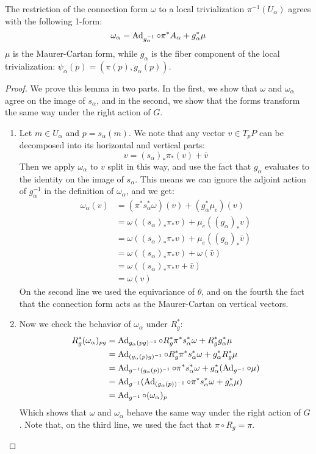 \begin{lem}
The restriction of the connection form $\omega$ to a local trivialization $\pi^{-1}(U_{\alpha})$ agrees with the following 1-form:
\[    \omega_{\alpha} = \operatorname{Ad}_{g_{\alpha}^{-1}} \circ \pi^* A_{\alpha} + g_{\alpha}^* \mu     \]
$\mu$ is the Maurer-Cartan form, while $g_{\alpha}$ is the fiber component of the local trivialization: $\psi_{\alpha}(p) = (\pi(p), g_{\alpha}(p))$.
\end{lem}

\begin{proof}
We prove this lemma in two parts. In the first, we show that $\omega$ and $\omega_{\alpha}$ agree on the image of $s_{\alpha}$, and in the second, we show that the forms transform the same way under the right action of $G$.
\begin{enumerate}
\item Let $m \in U_{\alpha}$ and $p = s_{\alpha}(m)$. We note that any vector $v \in T_pP$ can be decomposed into its horizontal and vertical parts:
\[   v = (s_{\alpha})_* \pi_* (v) + \bar v  \]
Then we apply $\omega_{\alpha}$ to $v$ split in this way, and use the fact that $g_{\alpha}$ evaluates to the identity on the image of $s_{\alpha}$. This means we can ignore the adjoint action of $g_{\alpha}^{-1}$ in the definition of $\omega_{\alpha}$, and we get:
\begin{align*}
\omega_{\alpha}(v) &= (\pi^* s_{\alpha}^* \omega)(v) + (g_{\alpha}^* \mu_e) (v) \\
&= \omega((s_{\alpha})_* \pi_* v) + \mu_e((g_{\alpha})_* v) \\
&= \omega((s_{\alpha})_* \pi_* v) + \mu_e((g_{\alpha})_* \bar v) \\
&= \omega((s_{\alpha})_* \pi_* v) + \omega(\bar v) \\
&= \omega((s_{\alpha})_* \pi_* v + \bar v) \\
&= \omega(v)
\end{align*}
On the second line we used the equivariance of $\theta$, and on the fourth the fact that the connection form acts as the Maurer-Cartan on vertical vectors.
\item Now we check the behavior of $\omega_{\alpha}$ under $R_g^*$:
\begin{align*}
R_g^*(\omega_{\alpha})_{pg} &= \operatorname{Ad}_{g_{\alpha}(pg)^{-1}} \circ R_g^* \pi^* s_{\alpha}^* \omega + R_{g}^* g_{\alpha}^* \mu \\
&= \operatorname{Ad}_{(g_{\alpha}(p)g)^{-1}} \circ R_g^* \pi^* s_{\alpha}^* \omega +  g_{\alpha}^* R_{g}^* \mu \\
&=  \operatorname{Ad}_{g^{-1}(g_{\alpha}(p))^{-1}} \circ  \pi^* s_{\alpha}^* \omega +  g_{\alpha}^*( \operatorname{Ad}_{g^{-1}}\circ \mu) \\
&= \operatorname{Ad}_{g^{-1}} ( \operatorname{Ad}_{(g_{\alpha}(p))^{-1}} \circ  \pi^* s_{\alpha}^* \omega +  g_{\alpha}^*\mu  ) \\
&= \operatorname{Ad}_{g^{-1}} \circ (\omega_{\alpha})_p
\end{align*}
Which shows that $\omega$ and $\omega_{\alpha}$ behave the same way under the right action of $G$. Note that, on the third line, we used the fact that $\pi \circ R_g = \pi$.
\end{enumerate}

\end{proof}


